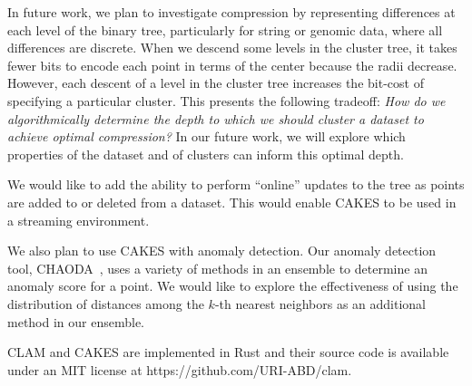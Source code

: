 In future work, we plan to investigate compression by representing differences at each level of the binary tree, particularly for string or genomic data, where all differences are discrete.
When we descend some levels in the cluster tree, it takes fewer bits to encode each point in terms of the center because the radii decrease.
However, each descent of a level in the cluster tree increases the bit-cost of specifying a particular cluster. 
This presents the following tradeoff:
\emph{How do we algorithmically determine the depth to which we should cluster a dataset to achieve optimal compression?} 
In our future work, we will explore which properties of the dataset and of clusters can inform this optimal depth.

We would like to add the ability to perform ``online'' updates to the tree as points are added to or deleted from a dataset.
This would enable CAKES to be used in a streaming environment.

We also plan to use CAKES with anomaly detection.
Our anomaly detection tool, CHAODA~\cite{ishaq2021clustered}, uses a variety of methods in an ensemble to determine an anomaly score for a point.
We would like to explore the effectiveness of using the distribution of distances among the $k$-th nearest neighbors as an additional method in our ensemble.

CLAM and CAKES are implemented in Rust and their source code is available under an MIT license at https://github.com/URI-ABD/clam.

